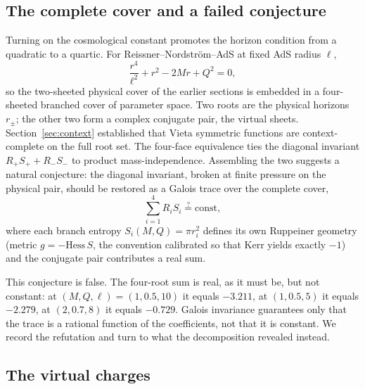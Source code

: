 \subsection{The complete cover and a failed conjecture}

Turning on the cosmological constant promotes the horizon condition from a quadratic to a quartic. For Reissner--Nordstr\"om--AdS at fixed AdS radius $\ell$,
\begin{equation}
\frac{r^4}{\ell^2} + r^2 - 2Mr + Q^2 = 0,
\label{eq:rnads-quartic}
\end{equation}
so the two-sheeted physical cover of the earlier sections is embedded in a four-sheeted branched cover of parameter space. Two roots are the physical horizons $r_\pm$; the other two form a complex conjugate pair, the virtual sheets. Section~\ref{sec:context} established that Vieta symmetric functions are context-complete on the full root set. The four-face equivalence ties the diagonal invariant $R_+S_+ + R_-S_-$ to product mass-independence. Assembling the two suggests a natural conjecture: the diagonal invariant, broken at finite pressure on the physical pair, should be restored as a Galois trace over the complete cover,
\begin{equation}
\sum_{i=1}^{4} R_i S_i \stackrel{?}{=} \mathrm{const},
\label{eq:galois-trace}
\end{equation}
where each branch entropy $S_i(M,Q) = \pi r_i^2$ defines its own Ruppeiner geometry (metric $g = -\mathrm{Hess}\,S$, the convention calibrated so that Kerr yields exactly $-1$) and the conjugate pair contributes a real sum.

This conjecture is false. The four-root sum is real, as it must be, but not constant: at $(M,Q,\ell) = (1, 0.5, 10)$ it equals $-3.211$, at $(1, 0.5, 5)$ it equals $-2.279$, at $(2, 0.7, 8)$ it equals $-0.729$. Galois invariance guarantees only that the trace is a rational function of the coefficients, not that it is constant. We record the refutation and turn to what the decomposition revealed instead.


\subsection{The virtual charges}

